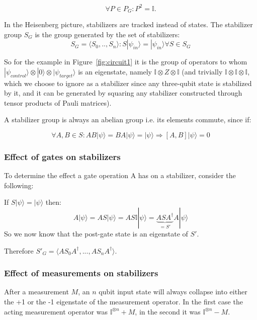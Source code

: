 \begin{equation}
    \forall P\in P_{G}: P^{2}=\mathbb{I}.
\end{equation}

In the Heisenberg picture, stabilizers are tracked instead of
states. 
The stabilizer group $S_{G}$ is the group generated by
the set of stabilizers:
\begin{equation}
	S_{G} = \langle S_{0},..,S_{n}\rangle: S|\psi_{in}\rangle = 
	|\psi_{in}\rangle \forall S \in S_{G}
\end{equation}

So for the example in Figure~\ref{fig:circuit1} it is the group
of operators to whom
$|\psi_{control}\rangle \otimes |0\rangle \otimes 
|\psi_{target}\rangle$ is an eigenstate, namely 
$\mathbb{I}\otimes Z \otimes \mathbb{I}$ (and trivially
$\mathbb{I}\otimes\mathbb{I}\otimes\mathbb{I}$, which we choose
to ignore as a stabilizer since any three-qubit state
is stabilized by it, and it can be generated by squaring any
stabilizer constructed through tensor products of Pauli matrices).

A stabilizer group is always an abelian group i.e. its elements 
 commute, since if:

\begin{equation}
	\label{abelian_stabilizers_equation}
	\forall A,B \in S: AB|\psi\rangle = BA|\psi\rangle = |\psi\rangle
	\Rightarrow [A,B]|\psi\rangle=0
\end{equation}

\subsubsection{Effect of gates on stabilizers}
To determine the effect a gate operation A has on a
stabilizer, consider the following:

If $S|\psi\rangle = |\psi\rangle$ then:
\begin{equation}
A|\psi\rangle = AS|\psi\rangle = AS\mathbb{I}|\psi\rangle
	= \underbrace{ASA^{\dagger}}_{=S'}A|\psi\rangle
\end{equation}
So we now know that the post-gate state is an eigenstate of $S'$.

Therefore $S'_{G} = \langle AS_{0}A^{\dagger},...,AS_{n}A^{\dagger}\rangle$.


\subsubsection{Effect of measurements on stabilizers}
After a measurement $M$, an $n$ qubit input state will always 
collapse into either the +1 or the -1 eigenstate of the 
measurement operator.
In the first case the acting measurement operator was 
$\mathbb{I}^{\otimes n}+M$, in the second it was
$\mathbb{I}^{\otimes n}-M$.


